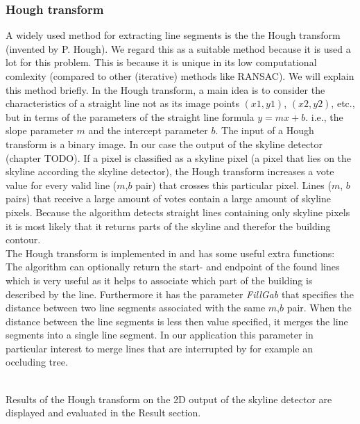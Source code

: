 \documentclass[10pt]{article}
\begin{document}
\subsubsection{Hough transform}
	A widely used method for extracting line segments is the the Hough transform
	(invented by P. Hough).  We regard this as a suitable method because it is
	used a lot for this problem. This is because it is unique in its low
	computational comlexity (compared to other (iterative) methods like RANSAC).
	We will explain this method briefly.
	In the Hough transform, a main idea is to consider the characteristics of a
	straight line not as its image points $(x1, y1)$, $(x2, y2)$, etc., but in
	terms of the parameters of the straight line formula $y = mx + b$. i.e., the
	slope parameter $m$ and the intercept parameter $b$.
	The input of a Hough transform is a binary image. In our case the output of 
	the skyline detector (chapter TODO).
	If a pixel is classified as a skyline pixel (a pixel that lies on the
	skyline according the skyline detector), the Hough transform increases
	a vote value for every valid line ($m$,$b$ pair) that crosses this
	particular pixel.  Lines ($m$, $b$ pairs) that receive a large amount of votes
	contain a large amount of skyline pixels.  
	Because the algorithm detects straight lines containing only skyline pixels it is
	most likely that it returns parts of the skyline and therefor the building contour. \\
	The Hough transform is implemented in  and has some useful extra functions:\\
	The algorithm can optionally return the start- and endpoint of the found lines 
	which is very useful as it helps to associate which part of the building is described by the line.
	Furthermore it has the parameter \emph{FillGab} that specifies the distance
	between two line segments associated with the same $m$,$b$ pair. When the
	distance between the line segments is less then value specified, it merges
	the line segments into a single line segment. In our application this
	parameter in particular interest to merge lines that are interrupted by for
	example an occluding tree.

	\\
	Results of the Hough transform on the 2D output of the skyline detector are
	displayed and evaluated in the Result section.
\end{document}
